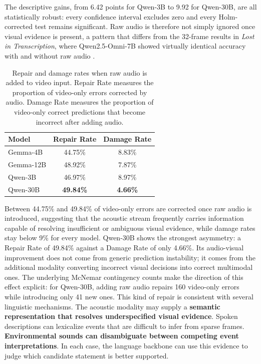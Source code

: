 The descriptive gains, from 6.42 points for Qwen-3B to 9.92 for Qwen-30B, are all statistically robust: every confidence interval excludes zero and every Holm-corrected test remains significant. Raw audio is therefore not simply ignored once visual evidence is present, a pattern that differs from the 32-frame results in \textit{Lost in Transcription}, where Qwen2.5-Omni-7B showed virtually identical accuracy with and without raw audio \cite{deodati2026lost}.
\begin{table}[h]
    \centering
    \small
    \begin{tabular}{lcc}
        \hline
        \textbf{Model} &
        \textbf{Repair Rate} &
        \textbf{Damage Rate} \\
        \hline
        Gemma-4B    & 44.75\% & 8.83\% \\
        Gemma-12B & 48.92\% & 7.87\% \\
        Qwen-3B & 46.97\% & 8.97\% \\
        Qwen-30B & \textbf{49.84\%} & \textbf{4.66\%} \\
        \hline
    \end{tabular}
    \caption{Repair and damage rates when raw audio is added to video input. Repair Rate measures the proportion of video-only errors corrected by audio. Damage Rate measures the proportion of video-only correct predictions that become incorrect after adding audio.}
    \label{tab:audio_repair_damage}
\end{table}
Between 44.75\% and 49.84\% of video-only errors are corrected once raw audio is introduced, suggesting that the acoustic stream frequently carries information capable of resolving insufficient or ambiguous visual evidence, while damage rates stay below 9\% for every model. Qwen-30B shows the strongest asymmetry: a Repair Rate of 49.84\% against a Damage Rate of only 4.66\%. Its audio-visual improvement does not come from generic prediction instability; it comes from the additional modality converting incorrect visual decisions into correct multimodal ones. The underlying McNemar contingency counts make the direction of this effect explicit: for Qwen-30B, adding raw audio repairs 160 video-only errors while introducing only 41 new ones.
This kind of repair is consistent with several linguistic mechanisms. The acoustic modality may supply a \textbf{semantic representation that resolves underspecified visual evidence}. Spoken descriptions can lexicalize events that are difficult to infer from sparse frames. \textbf{Environmental sounds can disambiguate between competing event interpretations}. In each case, the language backbone can use this evidence to judge which candidate statement is better supported.
